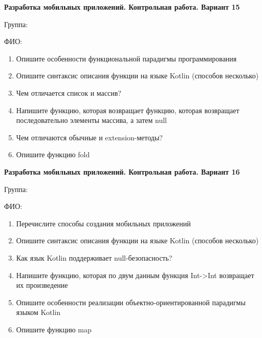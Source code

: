 \documentclass[12pt]{article}
\begin{document}
\newpage\begin{minipage}{\textwidth}
\textbf{Разработка мобильных приложений. Контрольная работа. Вариант 15}

Группа: \underline{\hspace{3cm}}

ФИО: \underline{\hspace{10cm}}

\begin{enumerate}
\item Опишите особенности функциональной парадигмы программирования
\item Опишите синтаксис описания функции на языке Kotlin (способов несколько)
\item Чем отличается список и массив?
\item Напишите функцию, которая возвращает функцию, которая возвращает последовательно элементы массива, а затем null
\item Чем отличаются обычные и extension-методы?
\item Опишите функцию fold

\end{enumerate}
\end{minipage}

\newpage\begin{minipage}{\textwidth}
\textbf{Разработка мобильных приложений. Контрольная работа. Вариант 16}

Группа: \underline{\hspace{3cm}}

ФИО: \underline{\hspace{10cm}}

\begin{enumerate}
\item Перечислите способы создания мобильных приложений
\item Опишите синтаксис описания функции на языке Kotlin (способов несколько)
\item Как язык Kotlin поддерживает null-безопасность?
\item Напишите функцию, которая по двум данным функция Int->Int возвращает их произведение
\item Опишите особенности реализации объектно-ориентированной парадигмы языком Kotlin
\item Опишите функцию map

\end{enumerate}
\end{minipage}
\end{document}

